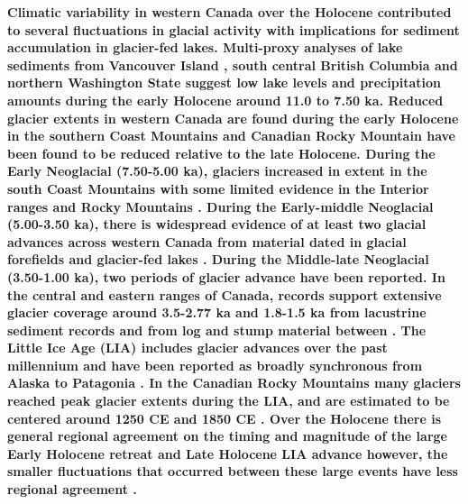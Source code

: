 \documentclass[Royal,times,doublespace,sageh]{sagej}
\begin{document}
\textbf{Climatic variability in western Canada over the Holocene
contributed to several fluctuations in glacial activity with
implications for sediment accumulation in glacier-fed lakes. Multi-proxy
analyses of lake sediments from Vancouver Island \citep{Brown2006},
south central British Columbia \citep{Lowe1997} and northern Washington
State \citep{Steinman2019} suggest low lake levels and precipitation
amounts during the early Holocene around 11.0 to 7.50 ka. Reduced
glacier extents in western Canada are found during the early Holocene in
the southern Coast Mountains \citep{Menounos2004, Koch2007a, Osborn2007}
and Canadian Rocky Mountain \citep{Luckman1988, Luckman1993} have been
found to be reduced relative to the late Holocene. During the Early
Neoglacial (7.50-5.00 ka), glaciers increased in extent in the south
Coast Mountains \citep{Osborn2007, Filippelli2006, Ryder1986} with some
limited evidence in the Interior ranges and Rocky Mountains
\citep{Luckman1993}. During the Early-middle Neoglacial (5.00-3.50 ka),
there is widespread evidence of at least two glacial advances across
western Canada from material dated in glacial forefields and glacier-fed
lakes
\citep{Koch2007a, Osborn2007, Menounos2008c, Gardner1985, Wood2004, Hodder2006b, Desloges1999, Leonard1999}.
During the Middle-late Neoglacial (3.50-1.00 ka), two periods of glacier
advance have been reported. In the central and eastern ranges of Canada,
records support extensive glacier coverage around 3.5-2.77 ka and
1.8-1.5 ka from lacustrine sediment records
\citep{Leonard1999, Leonard1997, Dirszowsky1997a, Desloges1999} and from
log and stump material between
\citep{Wood2004, Luckman1995, Luckman1999}. The Little Ice Age (LIA)
includes glacier advances over the past millennium and have been
reported as broadly synchronous from Alaska to Patagonia
\citep{Luckman2000g}. In the Canadian Rocky Mountains many glaciers
reached peak glacier extents during the LIA, and are estimated to be
centered around 1250 CE \citep{Luckman1995, Osborn2001, Leonard1997} and
1850 CE \citep{Luckman2000e, Leonard1997}. Over the Holocene there is
general regional agreement on the timing and magnitude of the large
Early Holocene retreat and Late Holocene LIA advance however, the
smaller fluctuations that occurred between these large events have less
regional agreement \citep{Menounos2009b}. }
\end{document}
